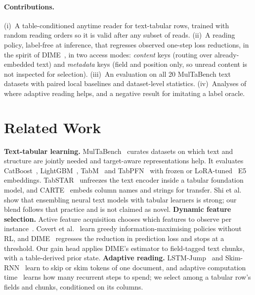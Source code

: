 \documentclass{article}
\begin{document}
\paragraph{Contributions.}
(i)~A table-conditioned anytime reader for text-tabular rows, trained with random reading orders so it is valid after any subset of reads.
(ii)~A reading policy, label-free at inference, that regresses observed one-step loss reductions, in the spirit of DIME~\cite{gadgil2024dime}, in two access modes: \emph{content} keys (routing over already-embedded text) and \emph{metadata} keys (field and position only, so unread content is not inspected for selection).
(iii)~An evaluation on all 20 MulTaBench text datasets with paired local baselines and dataset-level statistics.
(iv)~Analyses of where adaptive reading helps, and a negative result for imitating a label oracle.

\section{Related Work}

\textbf{Text-tabular learning.}
MulTaBench~\cite{arazi2026multabench} curates datasets on which text and structure are jointly needed and target-aware representations help.
It evaluates CatBoost~\cite{prokhorenkova2018catboost}, LightGBM~\cite{ke2017lightgbm}, TabM~\cite{gorishniy2024tabm} and TabPFN~\cite{hollmann2025tabpfn,grinsztajn2025tabpfn25} with frozen or LoRA-tuned~\cite{hu2022lora} E5 embeddings.
TabSTAR~\cite{arazi2025tabstar} unfreezes the text encoder inside a tabular foundation model, and CARTE~\cite{kim2024carte} embeds column names and strings for transfer.
Shi et al.~\cite{shi2021multimodal} show that ensembling neural text models with tabular learners is strong; our blend follows that practice and is not claimed as novel.
\textbf{Dynamic feature selection.}
Active feature acquisition chooses which features to observe per instance~\cite{shim2018afa}.
Covert et al.~\cite{covert2023dfs} learn greedy information-maximising policies without RL, and DIME~\cite{gadgil2024dime} regresses the reduction in prediction loss and stops at a threshold.
Our gain head applies DIME's estimator to field-tagged text chunks, with a table-derived prior state.
\textbf{Adaptive reading.}
LSTM-Jump~\cite{yu2017skim} and Skim-RNN~\cite{seo2018skimrnn} learn to skip or skim tokens of one document, and adaptive computation time~\cite{graves2016act} learns how many recurrent steps to spend; we select among a tabular row's fields and chunks, conditioned on its columns.
\end{document}
